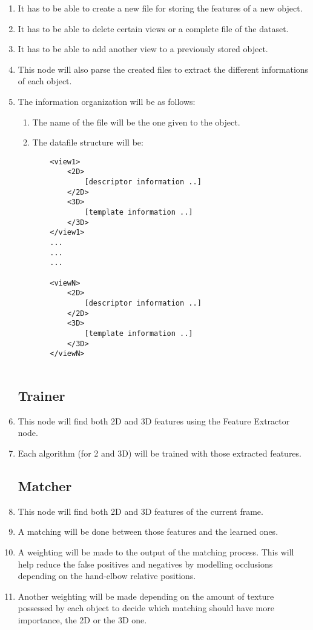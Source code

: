 \documentclass{article}
\makeatletter
\def\threedigits#1{\expandafter\@threedigits\csname c@#1\endcsname}
\def\@threedigits#1{%
  \ifnum#1<100 0\fi
  \ifnum#1<10 0\fi
  \number#1}
\makeatother
\begin{document}
\begin{enumerate}[label=\textbf{FR\threedigits*}]
\item It has to be able to create a new file for storing the features of a new object. 
\item It has to be able to delete certain views or a complete file of the dataset. 
\item It has to be able to add another view to a previously stored object. 

\item This node will also parse the created files to extract the different informations of each object. 

\item The information organization will be as follows: 
	\begin{enumerate}
	\item The name of the file will be the one given to the object. 
	\item The datafile structure will be: \\
		\begin{lstlisting}
	<view1>
		<2D>
			[descriptor information ..]
		</2D>
		<3D>
			[template information ..]
		</3D>
	</view1>	
	...
	...
	...		
			
	<viewN>
		<2D>
			[descriptor information ..]
		</2D>
		<3D>
			[template information ..]
		</3D>
	</viewN>	
		
		\end{lstlisting}
	\end{enumerate}
	

\subsection{Trainer}
	\item This node will find both 2D and 3D features using the Feature Extractor node. 
	\item Each algorithm (for 2 and 3D) will be trained with those extracted features. 

\subsection{Matcher}
	\item This node will find both 2D and 3D features of the current frame. 
	\item A matching will be done between those features and the learned ones. 
	\item A weighting will be made to the output of the matching process. This will help reduce the false positives and negatives by modelling occlusions depending on the hand-elbow relative positions. 
	\item Another weighting will be made depending on the amount of texture possessed by each object to decide which matching should have more importance, the 2D or the 3D one. 



\end{enumerate}
\end{document}
